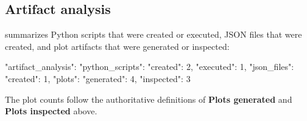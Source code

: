 \documentclass[11pt]{article}
\begin{document}
\subsection*{Artifact analysis}

 summarizes Python scripts that were created or executed, JSON files that were created, and plot artifacts that were generated or inspected:
\begin{DocCode}
{
  "artifact_analysis": {
    "python_scripts": {"created": 2, "executed": 1},
    "json_files": {"created": 1},
    "plots": {"generated": 4, "inspected": 3}
  }
}
\end{DocCode}
The plot counts follow the authoritative definitions of \textbf{Plots generated} and \textbf{Plots inspected} above.
\end{document}
